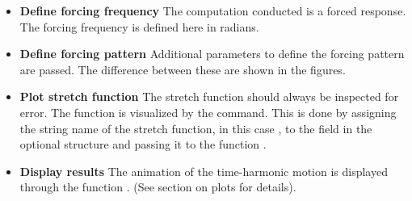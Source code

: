 \begin{itemize}

  \item{\textbf{Define forcing frequency}}
  The computation conducted is a forced response. The 
  forcing frequency  is defined here in radians.

  \item{\textbf{Define forcing pattern}}
  Additional parameters to define the forcing pattern are passed.
  The difference between these are shown in the figures.
  
  \item{\textbf{Plot stretch function}}
  The stretch function should always be inspected for error.
  The function is visualized by the  command.
  This is done by assigning the string name of the stretch function, 
  in this case , to the field 
  in the optional structure  and passing it to the 
  function . 

  \item{\textbf{Display results}}
  The animation of the time-harmonic motion is displayed through
  the function . (See section on plots for details).

\end{itemize}

